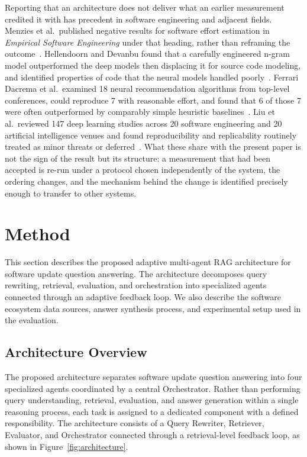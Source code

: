 \documentclass[acmsmall,review,anonymous,screen]{acmart}
\begin{document}
Reporting that an architecture does not deliver what an earlier measurement
credited it with has precedent in software engineering and adjacent fields.
Menzies et al.\ published negative results for software effort estimation in
\emph{Empirical Software Engineering} under that heading, rather than reframing
the outcome~\cite{menzies2017negative}. Hellendoorn and Devanbu found that a
carefully engineered n-gram model outperformed the deep models then displacing
it for source code modeling, and identified properties of code that the neural
models handled poorly~\cite{hellendoorn2017dnn}. Ferrari Dacrema et al.\
examined 18 neural recommendation algorithms from top-level conferences, could
reproduce 7 with reasonable effort, and found that 6 of those 7 were often
outperformed by comparably simple heuristic
baselines~\cite{dacrema2019progress}. Liu et al.\ reviewed 147 deep learning
studies across 20 software engineering and 20 artificial intelligence venues and
found reproducibility and replicability routinely treated as minor threats or
deferred~\cite{liu2021reproducibility}. What these share with the present paper
is not the sign of the result but its structure: a measurement that had been
accepted is re-run under a protocol chosen independently of the system, the
ordering changes, and the mechanism behind the change is identified precisely
enough to transfer to other systems.

\section{Method}\label{sec:method}

This section describes the proposed adaptive multi-agent RAG
architecture for software update question answering. The architecture
decomposes query rewriting, retrieval, evaluation, and orchestration
into specialized agents connected through an adaptive feedback loop. We
also describe the software ecosystem data sources, answer synthesis
process, and experimental setup used in the evaluation.

\subsection{Architecture Overview}

The proposed architecture separates software update question answering
into four specialized agents coordinated by a central Orchestrator.
Rather than performing query understanding, retrieval, evaluation, and
answer generation within a single reasoning process, each task is
assigned to a dedicated component with a defined responsibility. The
architecture consists of a Query Rewriter, Retriever, Evaluator, and
Orchestrator connected through a retrieval-level feedback loop, as
shown in Figure~\ref{fig:architecture}.
\end{document}
